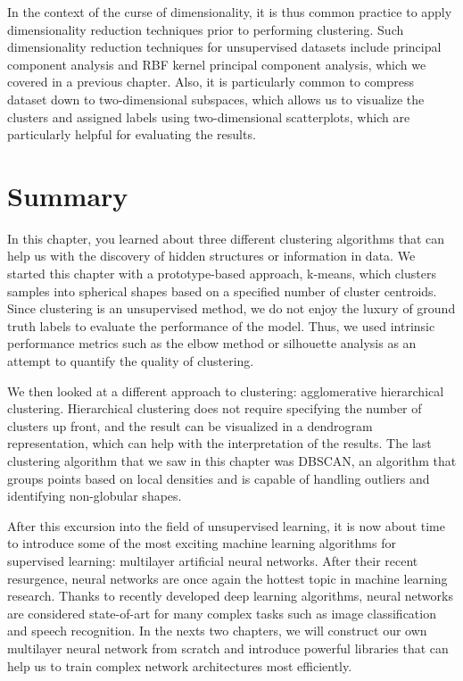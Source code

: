 \documentclass[11pt]{article}
\begin{document}
In the context of the curse of dimensionality, it is thus common
practice to apply dimensionality reduction techniques prior to
performing clustering. Such dimensionality reduction techniques for
unsupervised datasets include principal component analysis and RBF
kernel principal component analysis, which we covered in a previous
chapter. Also, it is particularly common to compress dataset down to
two-dimensional subspaces, which allows us to visualize the clusters and
assigned labels using two-dimensional scatterplots, which are
particularly helpful for evaluating the results.

    \section{Summary}\label{summary}

    In this chapter, you learned about three different clustering algorithms
that can help us with the discovery of hidden structures or information
in data. We started this chapter with a prototype-based approach,
k-means, which clusters samples into spherical shapes based on a
specified number of cluster centroids. Since clustering is an
unsupervised method, we do not enjoy the luxury of ground truth labels
to evaluate the performance of the model. Thus, we used intrinsic
performance metrics such as the elbow method or silhouette analysis as
an attempt to quantify the quality of clustering.

We then looked at a different approach to clustering: agglomerative
hierarchical clustering. Hierarchical clustering does not require
specifying the number of clusters up front, and the result can be
visualized in a dendrogram representation, which can help with the
interpretation of the results. The last clustering algorithm that we saw
in this chapter was DBSCAN, an algorithm that groups points based on
local densities and is capable of handling outliers and identifying
non-globular shapes.

After this excursion into the field of unsupervised learning, it is now
about time to introduce some of the most exciting machine learning
algorithms for supervised learning: multilayer artificial neural
networks. After their recent resurgence, neural networks are once again
the hottest topic in machine learning research. Thanks to recently
developed deep learning algorithms, neural networks are considered
state-of-art for many complex tasks such as image classification and
speech recognition. In the nexts two chapters, we will construct our own
multilayer neural network from scratch and introduce powerful libraries
that can help us to train complex network architectures most
efficiently.


    
    
    
    
\end{document}

